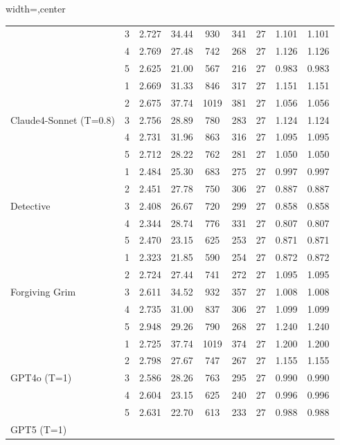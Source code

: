 \begin{table}[htbp]
\begin{adjustbox}{width=\textwidth,center}
\begin{tabular}{|l|c|c|c|c|c|c|c|c|}
 & 
3 & 
2.727 & 
34.44 & 
930 & 
341 & 
27 & 
1.101 & 
1.101 \\
 & 
4 & 
2.769 & 
27.48 & 
742 & 
268 & 
27 & 
1.126 & 
1.126 \\
 & 
5 & 
2.625 & 
21.00 & 
567 & 
216 & 
27 & 
0.983 & 
0.983 \\
\hline
\multirow{5}{*}{Claude4-Sonnet (T=0.8)} & 
1 & 
2.669 & 
31.33 & 
846 & 
317 & 
27 & 
1.151 & 
1.151 \\
 & 
2 & 
2.675 & 
37.74 & 
1019 & 
381 & 
27 & 
1.056 & 
1.056 \\
 & 
3 & 
2.756 & 
28.89 & 
780 & 
283 & 
27 & 
1.124 & 
1.124 \\
 & 
4 & 
2.731 & 
31.96 & 
863 & 
316 & 
27 & 
1.095 & 
1.095 \\
 & 
5 & 
2.712 & 
28.22 & 
762 & 
281 & 
27 & 
1.050 & 
1.050 \\
\hline
\multirow{5}{*}{Detective} & 
1 & 
2.484 & 
25.30 & 
683 & 
275 & 
27 & 
0.997 & 
0.997 \\
 & 
2 & 
2.451 & 
27.78 & 
750 & 
306 & 
27 & 
0.887 & 
0.887 \\
 & 
3 & 
2.408 & 
26.67 & 
720 & 
299 & 
27 & 
0.858 & 
0.858 \\
 & 
4 & 
2.344 & 
28.74 & 
776 & 
331 & 
27 & 
0.807 & 
0.807 \\
 & 
5 & 
2.470 & 
23.15 & 
625 & 
253 & 
27 & 
0.871 & 
0.871 \\
\hline
\multirow{5}{*}{Forgiving Grim} & 
1 & 
2.323 & 
21.85 & 
590 & 
254 & 
27 & 
0.872 & 
0.872 \\
 & 
2 & 
2.724 & 
27.44 & 
741 & 
272 & 
27 & 
1.095 & 
1.095 \\
 & 
3 & 
2.611 & 
34.52 & 
932 & 
357 & 
27 & 
1.008 & 
1.008 \\
 & 
4 & 
2.735 & 
31.00 & 
837 & 
306 & 
27 & 
1.099 & 
1.099 \\
 & 
5 & 
2.948 & 
29.26 & 
790 & 
268 & 
27 & 
1.240 & 
1.240 \\
\hline
\multirow{5}{*}{GPT4o (T=1)} & 
1 & 
2.725 & 
37.74 & 
1019 & 
374 & 
27 & 
1.200 & 
1.200 \\
 & 
2 & 
2.798 & 
27.67 & 
747 & 
267 & 
27 & 
1.155 & 
1.155 \\
 & 
3 & 
2.586 & 
28.26 & 
763 & 
295 & 
27 & 
0.990 & 
0.990 \\
 & 
4 & 
2.604 & 
23.15 & 
625 & 
240 & 
27 & 
0.996 & 
0.996 \\
 & 
5 & 
2.631 & 
22.70 & 
613 & 
233 & 
27 & 
0.988 & 
0.988 \\
\hline
\multirow{5}{*}{GPT5 (T=1)} & 

\end{tabular}
\end{adjustbox}
\end{table}
